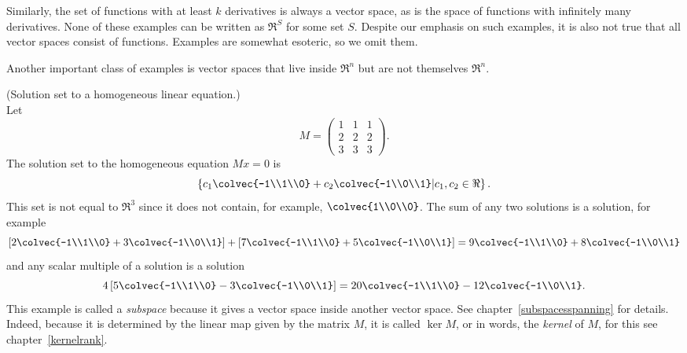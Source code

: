 Similarly, the set of functions with at least $k$ derivatives is always a vector space, as is the space of functions with infinitely many derivatives. 
None of these examples can be written as $\Re^S$ for some set $S$.
Despite our emphasis on such examples, it is also not true that all vector spaces consist of functions. Examples are somewhat esoteric, so we omit them.

Another important class of examples is vector spaces that live inside $\Re^n$ but are not themselves $\Re^n$. 

\begin{example} (Solution set to a homogeneous linear equation.)\\
Let 
\[ M = \begin{pmatrix}
      1 & 1 &1 \\
      2&2&2 \\
      3&3&3
    \end{pmatrix}.\]
    The solution set to the homogeneous equation $Mx=0$ is 
\[\left\{ c_1\colvec{-1\\1\\0} + c_2 \colvec{-1\\0\\1} \middle\vert c_1,c_2\in \Re \right\}.\]
    This set is not equal to $\Re^3$ since it does not contain, for example,  $\colvec{1\\0\\0}$. 
The sum of any two solutions is a solution, for example 
\[
    \left[ 2\colvec{-1\\1\\0} + 3 \colvec{-1\\0\\1} \right] 
+ \left [ 7\colvec{-1\\1\\0} + 5 \colvec{-1\\0\\1} \right]
=
 9\colvec{-1\\1\\0} + 8 \colvec{-1\\0\\1} 
\]
and any scalar multiple of a solution is a solution
\[
4\left[ 5\colvec{-1\\1\\0} - 3 \colvec{-1\\0\\1} \right]
=      20\colvec{-1\\1\\0} - 12 \colvec{-1\\0\\1} . 
\]
This example is called a {\it subspace} because it gives a vector space inside another vector space. See chapter~\ref{subspacesspanning}
for details. Indeed, because it is determined by the linear map given by the matrix $M$, it is called $\ker M$, or in words, the {\it kernel} of $M$,
for this see chapter~\ref{kernelrank}. 
\end{example}

